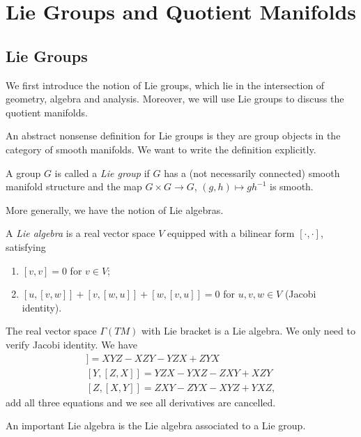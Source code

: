 \section{Lie Groups and Quotient Manifolds}

\subsection*{Lie Groups}

We first introduce the notion of Lie groups, which lie in the intersection of geometry, algebra and analysis.
Moreover, we will use Lie groups to discuss the quotient manifolds.

An abstract nonsense definition for Lie groups is they are group objects in the category of smooth manifolds.
We want to write the definition explicitly.
\begin{defn}
    A group $G$ is called a \emph{Lie group} if $G$ has a (not necessarily connected) smooth manifold structure and the map $G\times G\to G$, $(g,h)\mapsto gh^{-1}$ is smooth.
\end{defn}

More generally, we have the notion of Lie algebras.
\begin{defn}
    A \emph{Lie algebra} is a real vector space $V$ equipped with a bilinear form $[\cdot,\cdot]$, satisfying
    \begin{enumerate}[(1)]
        \item $[v,v]=0$ for $v\in V$;
        \item $[u,[v,w]]+[v,[w,u]]+[w,[v,u]]=0$ for $u,v,w\in V$ (Jacobi identity).
    \end{enumerate}
\end{defn}

\begin{eg}\label{Jacobi identity for vector fields}
    The real vector space $\Gamma(TM)$ with Lie bracket is a Lie algebra.
    We only need to verify Jacobi identity.
    We have
    \begin{gather*}
        [X,[Y,Z]]=XYZ-XZY-YZX+ZYX\\
        [Y,[Z,X]]=YZX-YXZ-ZXY+XZY\\
        [Z,[X,Y]]=ZXY-ZYX-XYZ+YXZ,
    \end{gather*}
    add all three equations and we see all derivatives are cancelled.
\end{eg}

An important Lie algebra is the Lie algebra associated to a Lie group.

